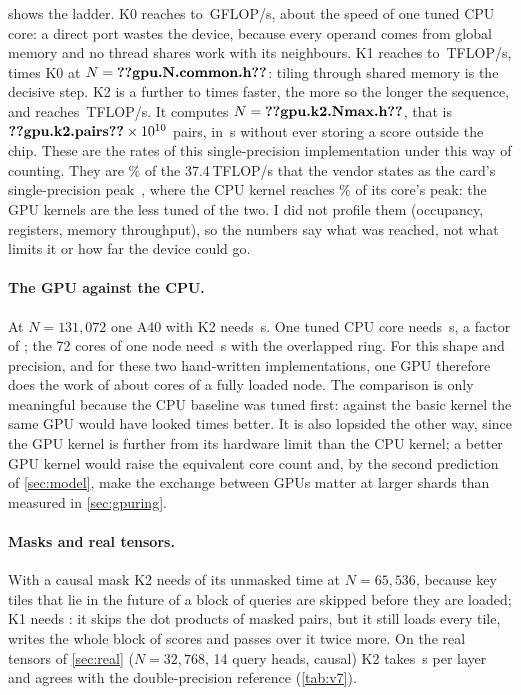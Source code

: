  shows the ladder. K0 reaches  to
\,GFLOP/s, about the speed of one tuned CPU core: a direct port wastes
the device, because every operand comes from global memory and no thread shares
work with its neighbours. K1 reaches  to \,TFLOP/s,
 times K0 at $N=\n{gpu.N.common.h}$: tiling through shared memory is
the decisive step. K2 is a further  to
 times faster, the more so the longer the sequence, and
reaches \,TFLOP/s. It computes $N=\n{gpu.k2.Nmax.h}$, that is
$\n{gpu.k2.pairs}\times10^{10}$ pairs, in \,s without ever storing a
score outside the chip. These are the rates of this single-precision
implementation under this way of counting. They are \% of the
37.4\,TFLOP/s that the vendor states as the card's single-precision
peak~\cite{a40}, where the CPU kernel reaches \% of its core's
peak: the GPU kernels are the less tuned of the two. I did not profile them
(occupancy, registers, memory throughput), so the numbers say what was reached,
not what limits it or how far the device could go.

\paragraph{The GPU against the CPU.} At $N=131{,}072$ one A40 with K2 needs
\,s. One tuned CPU core needs \,s, a factor of
; the 72 cores of one node need \,s with the
overlapped ring. For this shape and precision, and for these two hand-written
implementations, one GPU therefore does the work of about  cores
of a fully loaded node. The comparison is only meaningful because the CPU baseline
was tuned first: against the basic kernel the same GPU would have looked
 times better. It is also lopsided the other way, since the
GPU kernel is further from its hardware limit than the CPU kernel; a better GPU
kernel would raise the equivalent core count and, by the second prediction of
\cref{sec:model}, make the exchange between GPUs matter at larger shards than
measured in \cref{sec:gpuring}.

\paragraph{Masks and real tensors.} With a causal mask K2 needs
 of its unmasked time at $N=65{,}536$, because key tiles
that lie in the future of a block of queries are skipped before they are loaded; K1
needs : it skips the dot products of masked pairs, but it
still loads every tile, writes the whole block of scores and passes over it twice
more. On the real tensors of \cref{sec:real} ($N=32{,}768$, 14 query heads,
causal) K2 takes \,s per layer and agrees with the double-precision
reference (\cref{tab:v7}).

